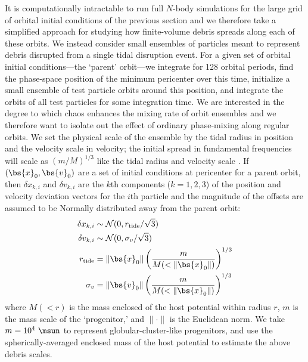 It is computationally intractable to run full $N$-body simulations for the large
grid of orbital initial conditions of the previous section and we therefore take
a simplified approach for studying how finite-volume debris spreads along each
of these orbits. We instead consider small ensembles of particles meant to
represent debris disrupted from a single tidal disruption event. For a given set
of orbital initial conditions---the `parent' orbit---we integrate for 128
orbital periods, find the phase-space position of the minimum pericenter over
this time, initialize a small ensemble of test particle orbits around this
position, and integrate the orbits of all test particles for some integration
time. We are interested in the degree to which chaos enhances the mixing rate of
orbit ensembles and we therefore want to isolate out the effect of ordinary
phase-mixing along regular orbits. We set the physical scale of the ensemble by
the tidal radius in position and the velocity scale in velocity; the initial
spread in fundamental frequencies will scale as $(m/M)^{1/3}$ like the tidal
radius and velocity scale \citep[e.g.,][]{johnston98, apw14}. If
$(\bs{x}_0,\bs{v}_0)$ are a set of initial conditions at pericenter for a parent
orbit, then $\delta x_{k,i}$ and $\delta v_{k,i}$ are the $k$th components
($k=1,2,3$) of the position and velocity deviation vectors for the $i$th
particle and the magnitude of the offsets are assumed to be Normally distributed
away from the parent orbit:
\begin{align}
	\delta x_{k,i} &\sim \mathcal{N}(0, r_{\rm tide}/\sqrt{3})\\
	\delta v_{k,i} &\sim \mathcal{N}(0, \sigma_v/\sqrt{3})\\
	r_{\rm tide} &= \|\bs{x}_0\| \left(\frac{m}{M(<\|\bs{x}_0\|)}\right)^{1/3} \\
	\sigma_v &= \|\bs{v}_0\|\left(\frac{m}{M(<\|\bs{x}_0\|)}\right)^{1/3}
\end{align}
where $M(<r)$ is the mass enclosed of the host potential within radius $r$, $m$
is the mass scale of the `progenitor,' and $\|\cdot \|$ is the Euclidean norm.
We take $m=10^4~\msun$ to represent globular-cluster-like progenitors, and use
the spherically-averaged enclosed mass of the host potential to estimate the
above debris scales. %

